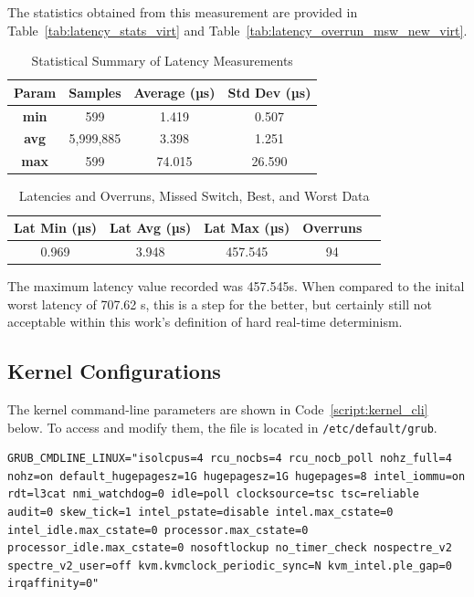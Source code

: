 \documentclass[MMR,Master,english]{twbook}
\begin{document}
\noindent The statistics obtained from this measurement are provided in Table~\ref{tab:latency_stats_virt} and Table~\ref{tab:latency_overrun_msw_new_virt}.

\begin{table}[H]
	\centering
	\caption{Statistical Summary of Latency Measurements}
	\label{tab:latency_stats_virt_bios}
	\begin{tabular}{|c|c|c|c|}
		\hline
		\textbf{Param} & \textbf{Samples} & \textbf{Average (µs)} & \textbf{Std Dev (µs)} \\ \hline
		\textbf{min}   & 599              & 1.419                 & 0.507                 \\ \hline
		\textbf{avg}   & 5,999,885        & 3.398                 & 1.251                 \\ \hline
		\textbf{max}   & 599              & 74.015                & 26.590                \\ \hline
	\end{tabular}
\end{table}

\begin{table}[H]
	\centering
	\caption{Latencies and Overruns, Missed Switch, Best, and Worst Data}
	\label{tab:latency_overrun_msw_new_virt_bios}
	\begin{tabular}{|c|c|c|c|c|}
		\hline
		\textbf{Lat Min (µs)} & \textbf{Lat Avg (µs)} & \textbf{Lat Max (µs)} & \textbf{Overruns} \\ \hline
		0.969                 & 3.948                 & 457.545               & 94                \\ \hline
	\end{tabular}
\end{table}

\noindent The maximum latency value recorded was 457.545\textmu s. When compared to the inital worst latency of 707.62 \textmu s, this is a step for the better, but certainly still not acceptable within this work's definition of hard real-time determinism.

\subsection{Kernel Configurations}\label{subsec:kernel_configurations}
The kernel command-line parameters are shown in Code~\ref{script:kernel_cli} below. To access and modify them, the file is located in \texttt{/etc/default/grub}.

\vspace{2em}
\begin{lstlisting}[name={Kernel Configuration},label={script:kernel_cli}]
		GRUB_CMDLINE_LINUX="isolcpus=4 rcu_nocbs=4 rcu_nocb_poll nohz_full=4 nohz=on default_hugepagesz=1G hugepagesz=1G hugepages=8 intel_iommu=on rdt=l3cat nmi_watchdog=0 idle=poll clocksource=tsc tsc=reliable audit=0 skew_tick=1 intel_pstate=disable intel.max_cstate=0 intel_idle.max_cstate=0 processor.max_cstate=0 processor_idle.max_cstate=0 nosoftlockup no_timer_check nospectre_v2 spectre_v2_user=off kvm.kvmclock_periodic_sync=N kvm_intel.ple_gap=0 irqaffinity=0"
\end{lstlisting}
\end{document}
